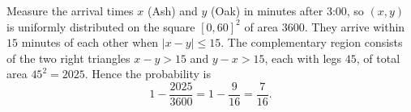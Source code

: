 Measure the arrival times $x$ (Ash) and $y$ (Oak) in minutes after 3:00, so $(x,y)$ is uniformly distributed on the square $[0,60]^2$ of area $3600$. They arrive within $15$ minutes of each other when $|x-y|\le15$. The complementary region consists of the two right triangles $x-y>15$ and $y-x>15$, each with legs $45$, of total area $45^2=2025$. Hence the probability is
\[1-\dfrac{2025}{3600}=1-\dfrac{9}{16}=\boxed{\dfrac{7}{16}}.\]
